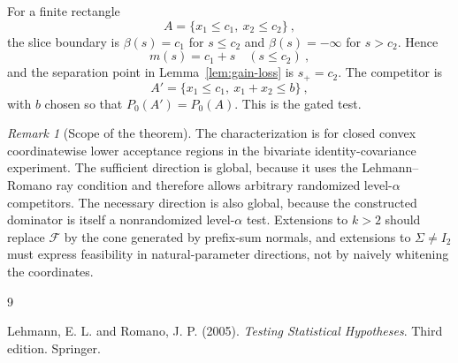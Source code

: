 \documentclass[12pt]{article}
\theoremstyle{remark}
\newtheorem{remark}{Remark}
\begin{document}
For a finite rectangle
\[
A=\{x_1\le c_1,
       \ x_2\le c_2\}~,
\]
the slice boundary is $\beta(s)=c_1$ for $s\le c_2$ and $\beta(s)=-\infty$ for $s>c_2$.  Hence
\[
m(s)=c_1+s\quad(s\le c_2)~,
\]
and the separation point in Lemma~\ref{lem:gain-loss} is $s_+=c_2$.  The competitor is
\[
A'=\{x_1\le c_1,
       \ x_1+x_2\le b\}~,
\]
with $b$ chosen so that $P_0(A')=P_0(A)$.  This is the gated test.

\begin{remark}[Scope of the theorem]
The characterization is for closed convex coordinatewise lower acceptance regions in the bivariate identity-covariance experiment.  The sufficient direction is global, because it uses the Lehmann--Romano ray condition and therefore allows arbitrary randomized level-$\alpha$ competitors.  The necessary direction is also global, because the constructed dominator is itself a nonrandomized level-$\alpha$ test.  Extensions to $k>2$ should replace $\mathcal F$ by the cone generated by prefix-sum normals, and extensions to $\Sigma\ne I_2$ must express feasibility in natural-parameter directions, not by naively whitening the coordinates.
\end{remark}

\begin{thebibliography}{9}

Lehmann, E. L. and Romano, J. P. (2005).
\textit{Testing Statistical Hypotheses}.
Third edition. Springer.

\end{thebibliography}
\end{document}
